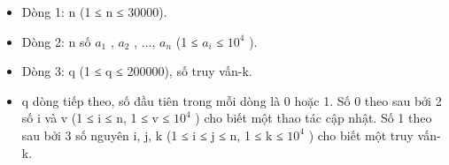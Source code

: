 \begin{itemize}
	\item     Dòng 1: n (1 ≤ n ≤ 30000).   
	\item     Dòng 2: n số $a_{1}$    , $a_{2}$    , ...,   $a_{n}$    (1 ≤ $a_{i}$    ≤   $10^{4}$    ).   
	\item     Dòng 3: q (1 ≤ q ≤ 200000), số truy vấn-k.   
	\item     q dòng tiếp theo, số đầu tiên trong mỗi dòng là 0 hoặc 1. Số 0 theo sau bởi 2 số i và v (1 ≤ i ≤ n, 1 ≤ v ≤ $10^{4}$    ) cho biết một thao tác cập nhật. Số 1 theo sau bởi 3 số nguyên i, j, k (1 ≤ i ≤ j ≤ n, 1 ≤ k ≤ $10^{4}$    ) cho biết một truy vấn-k.   
\end{itemize}